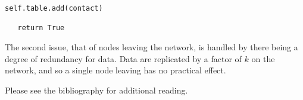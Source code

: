 \documentclass[12pt]{report}
\begin{document}
\begin{itemize}
\begin{lstlisting}[label=handle_node]
   self.table.add(contact)

   return True
\end{lstlisting}
    
    The second issue, that of nodes leaving the network, is handled by there
    being a degree of redundancy for data.  Data are replicated by a factor of
    $k$ on the network, and so a single node leaving has no practical effect.

    \end{itemize}

    Please see the bibliography for additional reading.
	
    \pagebreak

\nocite{*}
\printbibliography
\end{document}
